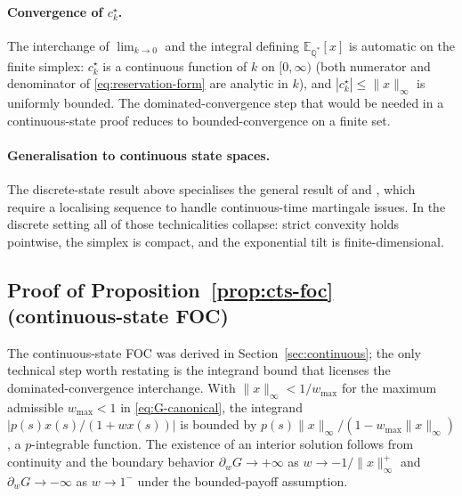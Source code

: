 \documentclass[11pt]{article}
\theoremstyle{definition}
\theoremstyle{remark}
\newcommand{\E}{\mathbb{E}}
\newcommand{\Q}{\mathbb{Q}}
\begin{document}
\paragraph{Convergence of $c^\star_k$.} The interchange of $\lim_{k \to 0}$
and the integral defining $\E_{\Q^*}[x]$ is automatic on the finite
simplex: $c^\star_k$ is a continuous function of $k$ on $[0, \infty)$
(both numerator and denominator of \eqref{eq:reservation-form} are
analytic in $k$), and $|c^\star_k| \le \|x\|_\infty$ is uniformly
bounded. The dominated-convergence step that would be needed in a
continuous-state proof reduces to bounded-convergence on a finite set.

\paragraph{Generalisation to continuous state spaces.} The
discrete-state result above specialises the general result of
\citet[Theorem 2.1]{frittelli2000} and \citet{delbaen2002}, which
require a localising sequence to handle continuous-time martingale
issues. In the discrete setting all of those technicalities collapse:
strict convexity holds pointwise, the simplex is compact, and the
exponential tilt is finite-dimensional.
\subsection{Proof of Proposition~\ref{prop:cts-foc} (continuous-state FOC)}

The continuous-state FOC was derived in Section~\ref{sec:continuous};
the only technical step worth restating is the integrand bound that
licenses the dominated-convergence interchange. With $\|x\|_\infty < 1
/ w_{\max}$ for the maximum admissible $w_{\max} < 1$ in
\eqref{eq:G-canonical}, the integrand
$|p(s) x(s) / (1 + w x(s))|$ is bounded by $p(s) \|x\|_\infty /
(1 - w_{\max} \|x\|_\infty)$, a $p$-integrable function. The
existence of an interior solution follows from continuity and the
boundary behavior $\partial_w G \to +\infty$ as $w \to -1/\|x\|_\infty^+$
and $\partial_w G \to -\infty$ as $w \to 1^-$ under the bounded-payoff
assumption.
\end{document}
